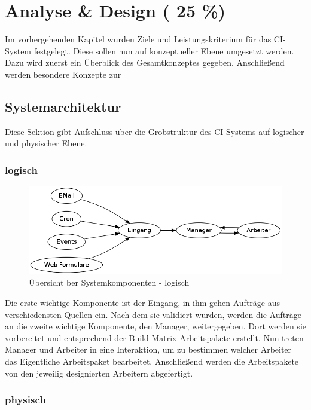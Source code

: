 \chapter{Analyse \& Design ( 25 \%)}
\label{chap:design}

Im vorhergehenden Kapitel wurden Ziele und Leistungskriterium
für das CI-System festgelegt.
Diese sollen nun auf konzeptueller Ebene umgesetzt werden.
Dazu wird zuerst ein Überblick des Gesamtkonzeptes gegeben.
Anschließend werden besondere Konzepte zur 


\section{Systemarchitektur}
\label{sec:design:sysarch}
Diese Sektion gibt Aufschluss über die Grobstruktur des CI-Systems auf logischer und physischer Ebene.

\subsection{logisch}

\begin{figure}[ht]
  \centering
  \label{fig:grob-layout-komponenten-logisch}
  \includegraphics[width=\textwidth]{imageinput/grob-layout-komponenten-logisch.png}
  \caption{\"Ubersicht ber Systemkomponenten - logisch}
\end{figure}


Die erste wichtige Komponente ist der Eingang,
in ihm gehen Aufträge aus verschiedensten Quellen ein.
Nach dem sie validiert wurden, werden die Aufträge an
die zweite wichtige Komponente, den Manager, weitergegeben.
Dort werden sie vorbereitet und entsprechend der Build-Matrix Arbeitspakete erstellt.
Nun treten Manager und Arbeiter in eine Interaktion,
um zu bestimmen welcher Arbeiter das Eigentliche Arbeitspaket bearbeitet.
Anschließend werden die Arbeitspakete von den jeweilig designierten Arbeitern abgefertigt.



\subsection{physisch}

